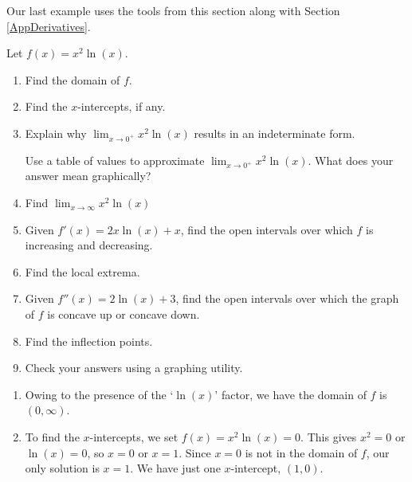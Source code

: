 \documentclass{ximera}
\begin{document}
Our last example uses the tools from this section along with Section \ref{AppDerivatives}.

\begin{example}\label{logcurvesketchex} Let  $f(x) = x^2 \ln(x)$.

\begin{enumerate}

\item  Find the domain of $f$.

\item  Find the $x$-intercepts, if any.

\item Explain why $\lim_{x \rightarrow 0^{+}} x^2 \ln(x)$ results in an indeterminate form.

Use a table of values  to approximate $\lim_{x \rightarrow 0^{+}} x^2 \ln(x)$.  What does your answer mean graphically? 

\item  Find  $\lim_{x \rightarrow \infty} x^2 \ln(x)$ 

\item  Given $f'(x) = 2x \ln(x) + x$, find the open intervals over which $f$ is increasing and decreasing.

\item  Find the local extrema.

\item  Given $f''(x) = 2 \ln(x) + 3$, find the open intervals over which the graph of $f$ is concave up or concave down.

\item Find the inflection points.

\item  Check your answers using a graphing utility.

\end{enumerate} 

\begin{explanation}

\begin{enumerate}

\item  Owing to the presence of the `$\ln(x)$' factor, we have the domain of $f$ is $(0, \infty)$.

\item  To find the $x$-intercepts, we set $f(x) = x^2 \ln(x) = 0$.  This gives $x^2 = 0$ or $\ln(x) = 0$, so $x = 0$ or $x = 1$.  Since $x=0$ is not in the domain of $f$, our only solution is $x = 1$. We have just one $x$-intercept, $(1,0)$.


\end{enumerate}
\end{explanation}
\end{example}
\end{document}

